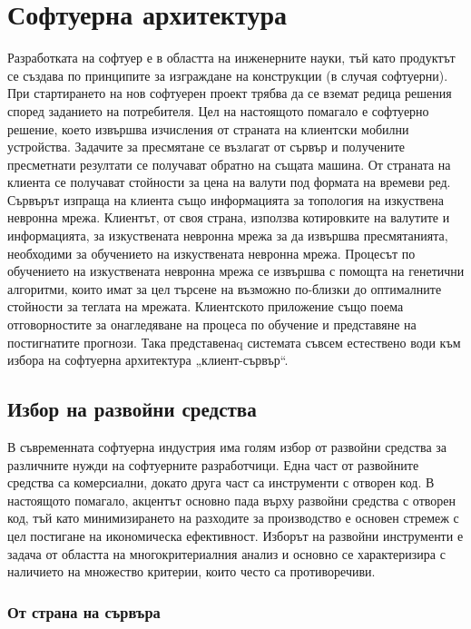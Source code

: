\newpage
\chapter{Софтуерна архитектура}
\label{chapter03}

Разработката на софтуер е в областта на инженерните науки, тъй като продуктът се създава по принципите за изграждане на конструкции (в случая софтуерни). При стартирането на нов софтуерен проект трябва да се вземат редица решения според заданието на потребителя. Цел на настоящото помагало е софтуерно решение, което извършва изчисления от страната на клиентски мобилни устройства. Задачите за пресмятане се възлагат от сървър и получените пресметнати резултати се получават обратно на същата машина. От страната на клиента се получават стойности за цена на валути под формата на времеви ред. Сървърът изпраща на клиента също информацията за топология на изкуствена невронна мрежа. Клиентът, от своя страна, използва котировките на валутите и информацията, за изкуствената невронна мрежа за да извършва пресмятанията, необходими за обучението на изкуствената невронна мрежа. Процесът по обучението на изкуствената невронна мрежа се извършва с помощта на генетични алгоритми, които имат за цел търсене на възможно по-близки до оптималните стойности за теглата на мрежата. Клиентското приложение също поема отговорностите за онагледяване на процеса по обучение и представяне на постигнатите прогнози. Така представенаq системата съвсем естествено води към избора на  софтуерна архитектура  „клиент-сървър“. 

\section{Избор на развойни средства}

В съвременната софтуерна индустрия има голям избор от развойни средства за различните нужди на софтуерните разработчици. Една част от развойните средства са комерсиални, докато друга част са инструменти с отворен код. В настоящото помагало, акцентът основно пада върху развойни средства с отворен код, тъй като минимизирането на разходите за производство е основен стремеж с цел постигане на икономическа ефективност. Изборът на развойни инструменти е задача от областта на многокритериалния анализ и основно се характеризира с наличието на множество критерии, които често са противоречиви. 

\subsection{От страна на сървъра}

